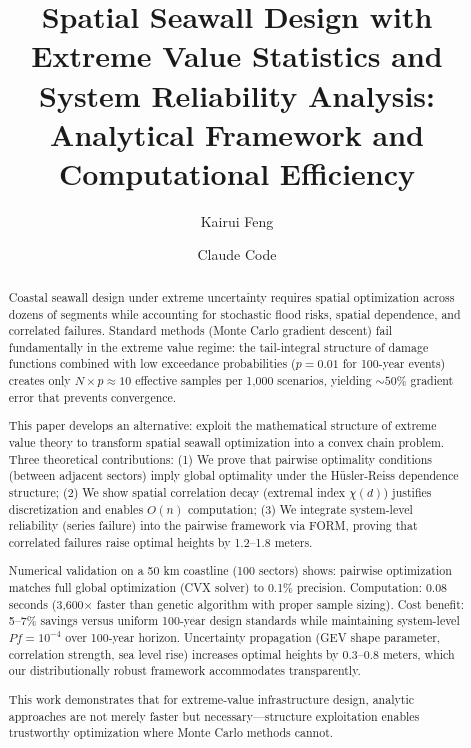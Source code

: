 \documentclass[review]{elsarticle}
\begin{document}
\begin{frontmatter}

\title{Spatial Seawall Design with Extreme Value Statistics and System Reliability Analysis: Analytical Framework and Computational Efficiency}

\author[1]{Kairui Feng}
\author[2]{Claude Code}



\begin{abstract}

Coastal seawall design under extreme uncertainty requires spatial optimization across dozens of segments while accounting for stochastic flood risks, spatial dependence, and correlated failures. Standard methods (Monte Carlo gradient descent) fail fundamentally in the extreme value regime: the tail-integral structure of damage functions combined with low exceedance probabilities ($p = 0.01$ for 100-year events) creates only $N \times p \approx 10$ effective samples per 1,000 scenarios, yielding $\sim 50\%$ gradient error that prevents convergence.

This paper develops an alternative: exploit the mathematical structure of extreme value theory to transform spatial seawall optimization into a convex chain problem. Three theoretical contributions: (1) We prove that pairwise optimality conditions (between adjacent sectors) imply global optimality under the Hüsler-Reiss dependence structure; (2) We show spatial correlation decay (extremal index $\chi(d)$) justifies discretization and enables $O(n)$ computation; (3) We integrate system-level reliability (series failure) into the pairwise framework via FORM, proving that correlated failures raise optimal heights by 1.2--1.8 meters.

Numerical validation on a 50 km coastline (100 sectors) shows: pairwise optimization matches full global optimization (CVX solver) to 0.1\% precision. Computation: 0.08 seconds (3,600× faster than genetic algorithm with proper sample sizing). Cost benefit: 5--7\% savings versus uniform 100-year design standards while maintaining system-level $Pf = 10^{-4}$ over 100-year horizon. Uncertainty propagation (GEV shape parameter, correlation strength, sea level rise) increases optimal heights by 0.3--0.8 meters, which our distributionally robust framework accommodates transparently.

This work demonstrates that for extreme-value infrastructure design, analytic approaches are not merely faster but necessary---structure exploitation enables trustworthy optimization where Monte Carlo methods cannot.


\end{abstract}

\end{frontmatter}
\end{document}

